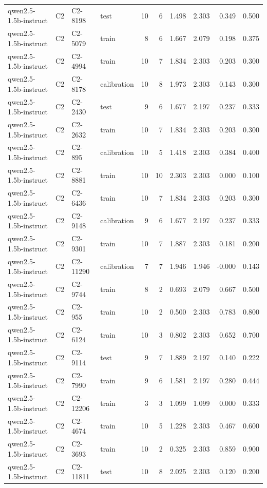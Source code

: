 \begin{table}
\begin{tabular}{llllrrrrrr}
qwen2.5-1.5b-instruct & C2 & C2-8198 & test & 10 & 6 & 1.498 & 2.303 & 0.349 & 0.500 \\
qwen2.5-1.5b-instruct & C2 & C2-5079 & train & 8 & 6 & 1.667 & 2.079 & 0.198 & 0.375 \\
qwen2.5-1.5b-instruct & C2 & C2-4994 & train & 10 & 7 & 1.834 & 2.303 & 0.203 & 0.300 \\
qwen2.5-1.5b-instruct & C2 & C2-8178 & calibration & 10 & 8 & 1.973 & 2.303 & 0.143 & 0.300 \\
qwen2.5-1.5b-instruct & C2 & C2-2430 & test & 9 & 6 & 1.677 & 2.197 & 0.237 & 0.333 \\
qwen2.5-1.5b-instruct & C2 & C2-2632 & train & 10 & 7 & 1.834 & 2.303 & 0.203 & 0.300 \\
qwen2.5-1.5b-instruct & C2 & C2-895 & calibration & 10 & 5 & 1.418 & 2.303 & 0.384 & 0.400 \\
qwen2.5-1.5b-instruct & C2 & C2-8881 & train & 10 & 10 & 2.303 & 2.303 & 0.000 & 0.100 \\
qwen2.5-1.5b-instruct & C2 & C2-6436 & train & 10 & 7 & 1.834 & 2.303 & 0.203 & 0.300 \\
qwen2.5-1.5b-instruct & C2 & C2-9148 & calibration & 9 & 6 & 1.677 & 2.197 & 0.237 & 0.333 \\
qwen2.5-1.5b-instruct & C2 & C2-9301 & train & 10 & 7 & 1.887 & 2.303 & 0.181 & 0.200 \\
qwen2.5-1.5b-instruct & C2 & C2-11290 & calibration & 7 & 7 & 1.946 & 1.946 & -0.000 & 0.143 \\
qwen2.5-1.5b-instruct & C2 & C2-9744 & train & 8 & 2 & 0.693 & 2.079 & 0.667 & 0.500 \\
qwen2.5-1.5b-instruct & C2 & C2-955 & train & 10 & 2 & 0.500 & 2.303 & 0.783 & 0.800 \\
qwen2.5-1.5b-instruct & C2 & C2-6124 & train & 10 & 3 & 0.802 & 2.303 & 0.652 & 0.700 \\
qwen2.5-1.5b-instruct & C2 & C2-9114 & test & 9 & 7 & 1.889 & 2.197 & 0.140 & 0.222 \\
qwen2.5-1.5b-instruct & C2 & C2-7990 & train & 9 & 6 & 1.581 & 2.197 & 0.280 & 0.444 \\
qwen2.5-1.5b-instruct & C2 & C2-12206 & train & 3 & 3 & 1.099 & 1.099 & 0.000 & 0.333 \\
qwen2.5-1.5b-instruct & C2 & C2-4674 & train & 10 & 5 & 1.228 & 2.303 & 0.467 & 0.600 \\
qwen2.5-1.5b-instruct & C2 & C2-3693 & train & 10 & 2 & 0.325 & 2.303 & 0.859 & 0.900 \\
qwen2.5-1.5b-instruct & C2 & C2-11811 & test & 10 & 8 & 2.025 & 2.303 & 0.120 & 0.200 \\

\end{tabular}
\end{table}

